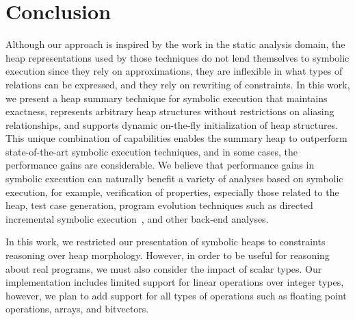 \section{Conclusion}


Although our approach is inspired by the work in the static analysis
domain, the heap representations used by those techniques do not lend
themselves to symbolic execution since they rely on
approximations, they are inflexible in what types of relations can be
expressed, and they rely on rewriting of constraints.  In this work,
we present a heap summary technique for symbolic execution that
maintains exactness, represents arbitrary heap structures without
restrictions on aliasing relationships, and supports dynamic
on-the-fly initialization of heap structures. This unique
combination of capabilities enables the summary heap to outperform
state-of-the-art symbolic execution techniques, and in some cases, the
performance gains are considerable. We believe that performance gains
in symbolic execution can naturally benefit a variety of analyses
based on symbolic execution, for example, verification of properties,
especially those related to the heap, test case generation, program
evolution techniques such as directed incremental symbolic
execution~\cite{person:pldi2011}, and other back-end analyses.

In this work, we restricted our presentation of symbolic heaps to
constraints reasoning over heap morphology. However, in order to be
useful for reasoning about real programs, we must also consider the
impact of scalar types. Our implementation includes limited support
for linear operations over integer types, however, we plan to add
support for all types of operations such as floating point operations,
arrays, and bitvectors.


